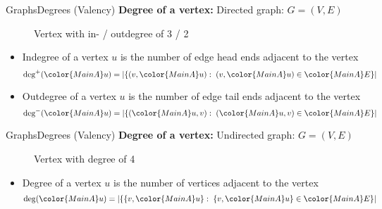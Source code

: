 \begin{frame}{Graphs}{Degrees (Valency)}
  \textbf{Degree of a vertex:} Directed graph:
   {\color{MainA}$G = (V , E)$}
    \begin{figure}
    \begin{adjustbox}{width=0.325\linewidth}
      
    \end{adjustbox}
    \caption{Vertex with in- / outdegree of 3 / 2}
    \label{fig:graph:degree_directed}
  \end{figure}
  \vspace{-1em}
  \begin{itemize}
    \item<3->
     {\color{MainA}Indegree} of a vertex {\color{MainA}$u$}
     is the number of {\color{MainA}edge head ends} adjacent to the
     vertex
     \begin{displaymath}
       \mathrm{deg}^{+}({\color{MainA}u}) =
       \left\vert \{
         (v, {\color{MainA}u})
         : \; (v, {\color{MainA}u}) \in {\color{MainA}E} \} 
       \right\vert
      \end{displaymath}
    \item<4->
      {\color{MainA}Outdegree} of a vertex {\color{MainA}$u$}
      is the number of {\color{MainA}edge tail ends} adjacent to the
      vertex
      \begin{displaymath}
        \mathrm{deg}^{-}({\color{MainA}u}) =
        \left\vert \{
          ({\color{MainA}u}, v)
          : \; ({\color{MainA}u}, v) \in {\color{MainA}E} \}
        \right\vert
      \end{displaymath}
  \end{itemize} 
\end{frame}


\begin{frame}{Graphs}{Degrees (Valency)}
  \textbf{Degree of a vertex:} Undirected graph:
         {\color{MainA}$G = (V , E)$}
  \begin{figure}
    \begin{adjustbox}{width=0.325\linewidth}
      
    \end{adjustbox}
    \caption{Vertex with degree of 4}
    \label{fig:graph:degree_undirected}
  \end{figure}       
  \begin{itemize}
    \item<3->
      {\color{MainA}Degree} of a vertex {\color{MainA}$u$}
      is the number of {\color{MainA}vertices} adjacent to the
      vertex
      \begin{displaymath}
        \mathrm{deg}({\color{MainA}u}) =
        \left\vert \{
          \{v, {\color{MainA}u}\}
          : \; \{v, {\color{MainA}u}\} \in {\color{MainA}E} \} 
        \right\vert
      \end{displaymath}
  \end{itemize}
\end{frame}

